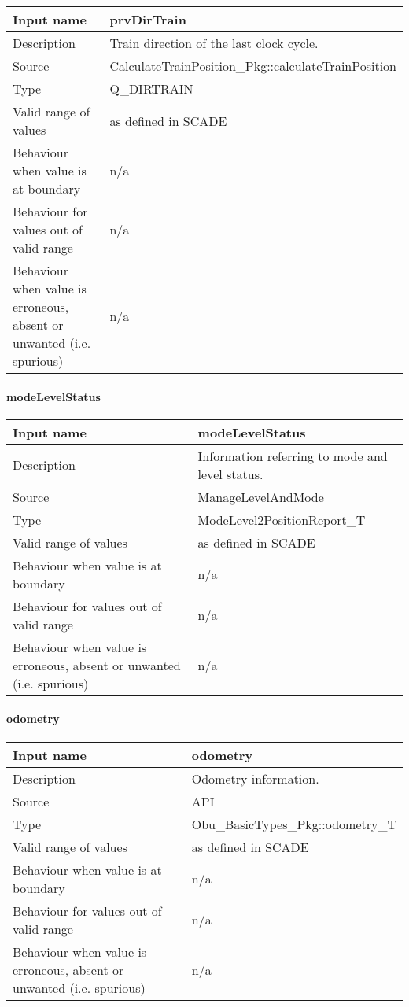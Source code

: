 \begin{longtable}{p{}p{}}
\toprule
Input name				& prvDirTrain \\
\midrule
Description				& Train direction of the last clock cycle. \\
\midrule
Source					& CalculateTrainPosition\_Pkg::calculateTrainPosition \\ 
\midrule
Type					& Q\_DIRTRAIN \\
\midrule
Valid range of values	& as defined in SCADE \\
\midrule
Behaviour when value is at boundary	& n/a \\
\midrule
Behaviour for values out of valid range	& n/a \\
\midrule
Behaviour when value is erroneous, absent or unwanted (i.e. spurious) & n/a \\
\bottomrule
\end{longtable}

\paragraph{modeLevelStatus}

\begin{longtable}{p{}p{}}
\toprule
Input name				& modeLevelStatus \\
\midrule
Description				& Information referring to mode and level status. \\
\midrule
Source					& ManageLevelAndMode \\ 
\midrule
Type					& ModeLevel2PositionReport\_T \\
\midrule
Valid range of values	& as defined in SCADE \\
\midrule
Behaviour when value is at boundary	& n/a \\
\midrule
Behaviour for values out of valid range	& n/a \\
\midrule
Behaviour when value is erroneous, absent or unwanted (i.e. spurious) & n/a \\
\bottomrule
\end{longtable}

\paragraph{odometry}

\begin{longtable}{p{}p{}}
\toprule
Input name				& odometry \\
\midrule
Description				& Odometry information.\\
\midrule
Source					& API \\ 
\midrule
Type					& Obu\_BasicTypes\_Pkg::odometry\_T \\
\midrule
Valid range of values	& as defined in SCADE \\
\midrule
Behaviour when value is at boundary	& n/a \\
\midrule
Behaviour for values out of valid range	& n/a \\
\midrule
Behaviour when value is erroneous, absent or unwanted (i.e. spurious) & n/a \\
\bottomrule
\end{longtable}

